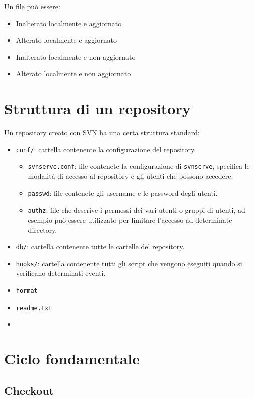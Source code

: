 Un file può essere:

\begin{itemize}
\item Inalterato localmente e aggiornato 
\item Alterato localmente e aggiornato 
\item Inalterato localmente e non aggiornato 
\item Alterato localmente e non aggiornato
\end{itemize}

\section{Struttura di un repository}

Un repository creato con SVN ha una certa struttura standard:

\begin{itemize}
	\item \texttt{conf/}: cartella contenente la configurazione del repository.
	\begin{itemize}
		\item \texttt{svnserve.conf}: file contenete la configurazione di \texttt{svnserve}, specifica le modalità di accesso al repository e gli utenti che possono accedere.
		\item \texttt{passwd}: file contenete gli username e le password degli utenti.
		\item \texttt{authz}: file che descrive i permessi dei vari utenti o gruppi di utenti, ad esempio può essere utilizzato per limitare l'accesso ad determinate directory.
	\end{itemize}
	\item \texttt{db/}: cartella contenente tutte le cartelle del repository.
	\item \texttt{hooks/}: cartella contenente tutti gli script che vengono eseguiti quando si verificano determinati eventi.
	\item \texttt{format}
	\item \texttt{readme.txt}
	\item {}
\end{itemize}


\section{Ciclo fondamentale}

\subsection{Checkout}

